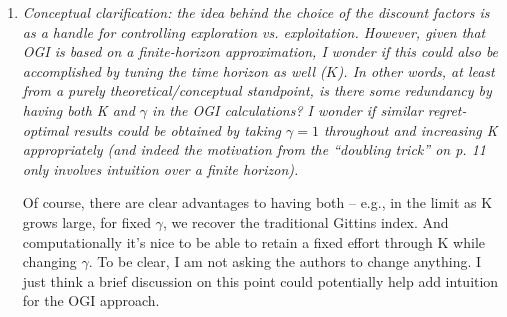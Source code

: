 \documentclass[11pt]{article}
\newcommand{\1}{\ensuremath{\mathbf{1}}} %
\theoremstyle{thm-sf}
\begin{document}
\begin{enumerate}

{\em (b) when approximations are used (e.g., Powell and Ryzhov 2012) can you please briefly discuss how good these approximations are?}

The approximation in Powell and Ryzhov is based on a calculation due to Gittins: in the Gaussian model, the index can effectively be written as a simple function of the discount factor multiplied by a certain {\em univariate} function of the posterior variance divided by the discount factor. Whereas this latter univariate function is not characterized analytically, Powell and Ryzhov propose a certain analytic approximation of this univariate function which they show (in their Figure 5.1) to provide an excellent approximation to the exact index for a variety of values of the discount factor and posterior variance.    
		
\item {\it Conceptual clarification: the idea behind the choice of the discount factors is as a handle for controlling exploration vs. exploitation. However, given that OGI is based on a finite-horizon approximation, I wonder if this could also be accomplished by tuning the time horizon as well ($K$). In other words, at least from a purely theoretical/conceptual standpoint, is there some redundancy by having both K and $\gamma$ in the OGI calculations? I wonder if similar regret-optimal results could be obtained by taking $\gamma=1$ throughout and increasing K appropriately (and indeed the motivation from the “doubling trick” on p. 11 only involves intuition over a finite horizon).

Of course, there are clear advantages to having both – e.g., in the limit as K grows large, for fixed $\gamma$, we recover the traditional Gittins index. And computationally it’s nice to be able to retain a fixed effort through K while changing $\gamma$.
To be clear, I am not asking the authors to change anything. I just think a brief discussion on this point could potentially help add intuition for the OGI approach.	
}


\end{enumerate}
\end{document}
